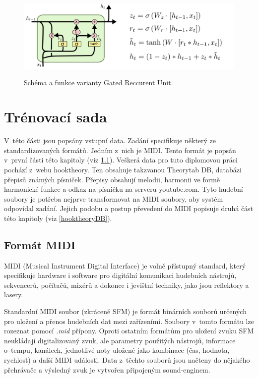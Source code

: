 \begin{figure}[h]\centering
    \centering
    \includegraphics[width=0.8\linewidth]{obrazky/LSTM3-var-GRU.png}\\[1pt]  
    \caption{Schéma a funkce varianty Gated Reccurent Unit. \cite{colah_lstm}}    
    \label{obrazekGRU}
\end{figure}

\chapter{Trénovací sada}
V~této části jsou popsány vstupní data.
Zadání specifikuje některý ze standardizovaných formátů.
Jedním z~nich je MIDI.
Tento formát je popsán v~první části této kapitoly (viz \ref{midisoubory}).
Veškerá data pro tuto diplomovou práci pochází z~webu hooktheory.
Ten obsahuje takzvanou Theorytab DB, databázi přepisů známých písniček.
Přepisy obsahují melodii, harmonii ve formě harmonické funkce 
a odkaz na písničku na serveru youtube.com.
Tyto hudební soubory je potřeba nejprve transformovat na MIDI soubory,
aby systém odpovídal zadání.
Jejich podobu a postup převedení do MIDI popisuje druhá část této kapitoly (viz \ref{hooktheoryDB}).

\section{Formát MIDI}
\label{midisoubory}
MIDI (Musical Instrument Digital Interface) je volně přístupný standard,
který specifikuje hardware i software 
pro digitální komunikaci hudebních nástrojů,
sekvencerů, počítačů, mixérů 
a dokonce i jevištní techniky, jako jsou reflektory a lasery.
\cite{MIDI_tutorials}
\par

Standardní MIDI soubor (zkráceně SFM) je formát binárních souborů 
určených pro uložení a přenos hudebních dat mezi zařízeními.
Soubory v~tomto formátu lze rozeznat pomocí \emph{.mid} přípony.
Oproti ostatním formátům pro uložení zvuku 
SFM neukládají digitalizovaný zvuk,
ale parametry použitých nástrojů, informace o~tempu, kanálech, 
jednotlivé noty uložené jako kombinace (čas, hodnota, rychlost) 
a další MIDI události.
Data z~těchto souborů jsou načteny do nějakého přehrávače 
a výsledný zvuk je vytvořen připojeným sound-enginem.
\cite{MIDI_tutorials,Glatt_aboutMIDIFiles}
\par

